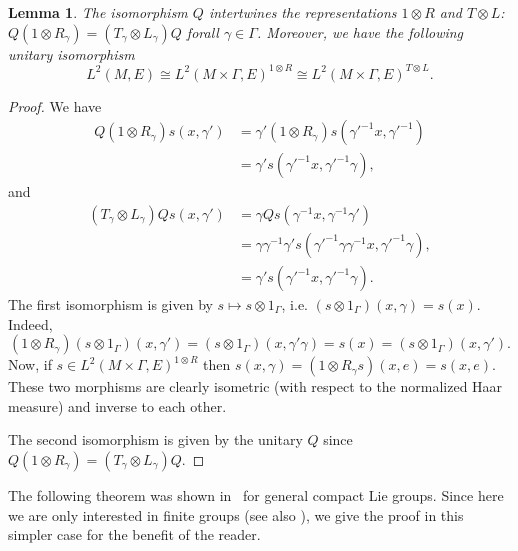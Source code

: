 \documentclass[11pt,a4paper]{amsart}
\newcommand\<{\langle}
\renewcommand\>{\rangle}
\newtheorem{lemma}[theorem]{Lemma}
\theoremstyle{definition}
\begin{document}
\begin{lemma} \label{lem.iso.commut}
The isomorphism $Q$ intertwines the representations $1 \otimes R$ and $T\otimes L$: $Q(1 \otimes R_\gamma)=(T_\gamma \otimes L_\gamma)Q$ forall $\gamma\in\Gamma$. Moreover, we have the following unitary isomorphism 
\begin{equation}
L^2(M,E) \cong L^2(M\times \Gamma,E)^{1\otimes R} \cong L^2(M \times \Gamma,E)^{T\otimes L}.
\end{equation}
\end{lemma}

\begin{proof}
We have 
\begin{align*}
Q(1\otimes R_\gamma)s(x,\gamma')&=\gamma'(1 \otimes R_\gamma)s(\gamma'^{-1}x,\gamma'^{-1})\\
&=\gamma's(\gamma'^{-1}x,\gamma'^{-1}\gamma), 
\end{align*}
and 
\begin{align*}
(T_\gamma \otimes L_\gamma)Qs(x,\gamma')&=\gamma Qs(\gamma^{-1}x,\gamma^{-1}\gamma')\\
&=\gamma\gamma^{-1}\gamma's(\gamma'^{-1}\gamma \gamma^{-1}x,\gamma'^{-1}\gamma),\\
&=\gamma's(\gamma'^{-1}x,\gamma'^{-1}\gamma). 
\end{align*}
The first isomorphism is given by $s \mapsto s \otimes 1_\Gamma$, i.e. $(s\otimes 1_\Gamma)(x,\gamma) = s(x)$. 
Indeed, 
$$
 (1 \otimes R_\gamma)(s \otimes 1_\Gamma)(x, \gamma')=(s \otimes 1_\Gamma)(x,\gamma'\gamma)=s(x)=(s\otimes 1_\Gamma)(x,\gamma').
 $$
Now, if $s\in L^2(M\times \Gamma , E)^{1\otimes R}$ then $s(x,\gamma)=(1 \otimes R_\gamma s)(x,e)=s(x,e)$.
These two morphisms are clearly isometric (with respect to the normalized Haar measure) and inverse to each other.

The second isomorphism is given by the unitary $Q$ since $Q(1\otimes R_\gamma)=(T_\gamma \otimes L_\gamma)Q$.
\end{proof}

The following theorem was shown in~\cite{Sternin.unif} for general compact Lie groups. Since here we are only interested in finite groups (see also \cite{Antonevich1973}), we give the proof in this simpler case for the benefit of the reader.
\end{document}
